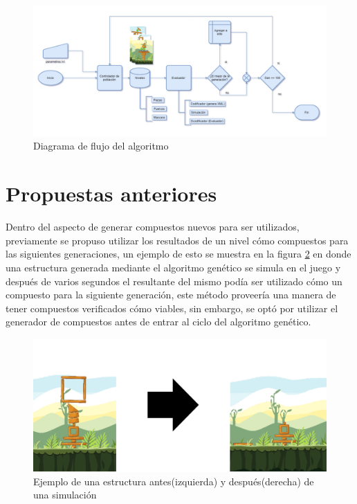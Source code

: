 \begin{figure}
  \centering
  \includegraphics[width=1.0\textwidth]{img/system_model.png}
  \caption{Diagrama de flujo del algoritmo}
  \label{figure:algorithm_model}
\end{figure}

\section{Propuestas anteriores}
\label{section:previous-proposed-methods}

Dentro del aspecto de generar compuestos nuevos para ser utilizados, previamente
se propuso utilizar los resultados de un nivel cómo compuestos para las
siguientes generaciones, un ejemplo de esto se muestra en la figura
\ref{figure:prev_composite_proposal_bef_aft} en donde una estructura generada
mediante el algoritmo genético se simula en el juego y después de varios
segundos el resultante del mismo podía ser utilizado cómo un compuesto para la
siguiente generación, este método proveería una manera de tener compuestos
verificados cómo viables, sin embargo, se optó por utilizar el generador de
compuestos antes de entrar al ciclo del algoritmo genético.

\begin{figure}
  \centering
  \includegraphics[width=1.0\textwidth]{img/simulation_bef_aft_example.png}
  \caption{Ejemplo de una estructura antes(izquierda) y después(derecha) de una simulación}
  \label{figure:prev_composite_proposal_bef_aft}
\end{figure}

